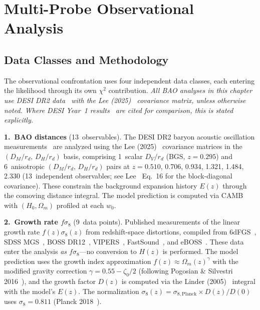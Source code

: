 \section{Multi-Probe Observational Analysis}
\label{sec:2-multiprobe}

\subsection{Data Classes and Methodology}
\label{sec:2-multiprobe-data}

The observational confrontation uses four independent data classes, each entering the likelihood through its own $\chi^2$ contribution. \emph{All BAO analyses in this chapter use DESI DR2 data~\cite{ch2:DESIDR2} with the Lee (2025)~\cite{ch2:Lee2025} covariance matrix, unless otherwise noted. Where DESI Year~1 results~\cite{ch2:DESI2024} are cited for comparison, this is stated explicitly.}

\textbf{1.\ BAO distances} (13~observables). The DESI DR2 baryon acoustic oscillation measurements~\cite{ch2:DESIDR2} are analyzed using the Lee (2025)~\cite{ch2:Lee2025} covariance matrices in the $(D_M/r_d,\, D_H/r_d)$ basis, comprising 1~scalar $D_V/r_d$ (BGS, $z = 0.295$) and 6~anisotropic $(D_M/r_d,\, D_H/r_d)$ pairs at $z = 0.510$, 0.706, 0.934, 1.321, 1.484, 2.330 (13~independent observables; see Lee~\cite{ch2:Lee2025} Eq.~16 for the block-diagonal covariance). These constrain the background expansion history $E(z)$ through the comoving distance integral. The model prediction is computed via CAMB with $(H_0, \Omega_m)$ profiled at each $w_0$.

\textbf{2.\ Growth rate $f\sigma_8$} (9~data points). Published measurements of the linear growth rate $f(z)\sigma_8(z)$ from redshift-space distortions, compiled from 6dFGS~\cite{ch2:Beutler2012}, SDSS MGS~\cite{ch2:Howlett2015}, BOSS DR12~\cite{ch2:BOSS2017}, VIPERS~\cite{ch2:Pezzotta2017}, FastSound~\cite{ch2:Okumura2016}, and eBOSS~\cite{ch2:Hou2021,ch2:duMas2020}. These data enter the analysis \emph{as $f\sigma_8$}---no conversion to $H(z)$ is performed. The model prediction uses the growth index approximation $f(z) \approx \Omega_m(z)^\gamma$ with the modified gravity correction $\gamma = 0.55 - \zeta_0/2$ (following Pogosian \& Silvestri 2016~\cite{ch2:Pogosian2016}), and the growth factor $D(z)$ is computed via the Linder (2005)~\cite{ch2:Linder2005} integral with the model's $E(z)$. The normalization $\sigma_8(z) = \sigma_{8,\mathrm{Planck}} \times D(z)/D(0)$ uses $\sigma_8 = 0.811$ (Planck 2018~\cite{ch2:Planck2018}).

